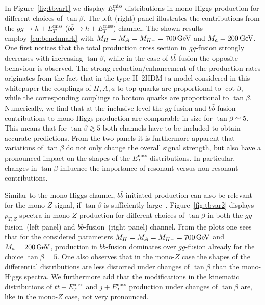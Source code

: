 \documentclass[a4paper, 11pt,notoc]{article}
\newcommand{\MET}{\ensuremath{E_T^\mathrm{miss}}\xspace}
\newcommand{\mA}{\ensuremath{M_{A}}\xspace}
\newcommand{\ma}{\ensuremath{M_{a}}\xspace}
\newcommand{\mH}{\ensuremath{M_{H}}\xspace}
\newcommand{\mHc}{\ensuremath{M_{H^{\pm}}}\xspace}
\newcommand{\hdma}{\ensuremath{\textrm{2HDM+a}}\xspace}
\begin{document}
In Figure~\ref{fig:tbvar1} we display $\MET$ distributions in mono-Higgs production for different choices of $\tan \beta$. The left (right) panel illustrates the contributions from the $gg \to h + \MET$ ($b \bar b \to h + \MET$) channel. The shown results employ~\eqref{eq:benchmark} with $\mH = \mA = \mHc = 700 \, {\rm GeV}$ and $\ma = 200 \, {\rm GeV}$. One first notices that the total production cross section in $gg$-fusion strongly decreases with increasing $\tan \beta$, while in the case of $b \bar b$-fusion the opposite behaviour is observed. The strong reduction/enhancement of the production rates originates from the fact that in  the type-II~\hdma model considered in this whitepaper the couplings of $H,A,a$ to top quarks are proportional to $\cot \beta$, while the corresponding couplings to bottom quarks are proportional to $\tan \beta$. Numerically, we find that at the inclusive level the $gg$-fusion and $b\bar b$-fusion contributions to mono-Higgs production are comparable in size for $\tan \beta \simeq 5$. This means that for $\tan \beta \gtrsim 5$ both channels have to be included to obtain accurate predictions. From the two panels it is furthermore apparent that variations of $\tan \beta$ do not only change the overall signal strength, but also have a pronounced impact on the shapes of the $\MET$ distributions. In particular, changes in $\tan \beta$ influence the importance of resonant versus non-resonant contributions. 

 Similar to the mono-Higgs channel, $b \bar b$-initiated production can also be relevant for the mono-$Z$ signal,  if $\tan \beta$ is sufficiently large~\cite{Bauer:2017ota}. Figure~\ref{fig:tbvar2} displays $p_{T,Z}$ spectra in mono-$Z$ production for different choices of $\tan \beta$ in both the $gg$-fusion~(left panel) and $b \bar b$-fusion~(right panel) channel.  From the plots one sees that for the considered parameters $\mH = \mA = \mHc = 700 \, {\rm GeV}$ and $\ma = 200 \, {\rm GeV}$,  production in $b \bar b$-fusion dominates over $gg$-fusion already for the choice $\tan \beta = 5$. One also observes that  in the mono-$Z$ case   the shapes of the differential distributions are less distorted under changes of $\tan \beta$ than the mono-Higgs spectra. We furthermore  add that the modifications in the kinematic distributions of $t \bar t + \MET$ and $j +\MET$ production under changes of $\tan \beta$ are, like in the mono-$Z$ case, not very pronounced.
 
\end{document}
